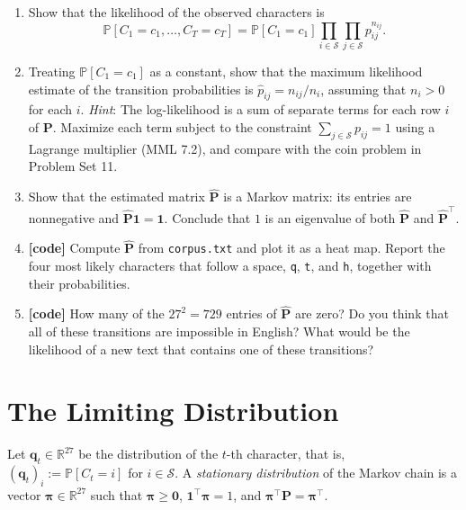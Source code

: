 \documentclass[letterpaper]{article}
\newcommand{\Real}{\mathbb{R}}
\newcommand{\tr}{^\top}
\begin{document}
\begin{enumerate}
\item Show that the likelihood of the observed characters is
  \[
    \mathbb{P}[C_1 = c_1, \dots, C_T = c_T] = \mathbb{P}[C_1 = c_1] \prod_{i \in \mathcal{S}} \prod_{j \in \mathcal{S}} p_{ij}^{n_{ij}}.
  \]
\item Treating $\mathbb{P}[C_1 = c_1]$ as a constant, show that the maximum likelihood estimate of the transition probabilities is $\hat{p}_{ij} = n_{ij} / n_i$, assuming that $n_i > 0$ for each $i$. \emph{Hint}: The log-likelihood is a sum of separate terms for each row $i$ of $\bm{P}$. Maximize each term subject to the constraint $\sum_{j \in \mathcal{S}} p_{ij} = 1$ using a Lagrange multiplier (MML 7.2), and compare with the coin problem in Problem Set 11.
\item Show that the estimated matrix $\hat{\bm{P}}$ is a Markov matrix: its entries are nonnegative and $\hat{\bm{P}} \bm{1} = \bm{1}$. Conclude that $1$ is an eigenvalue of both $\hat{\bm{P}}$ and $\hat{\bm{P}}\tr$.
\item \textbf{[code]} Compute $\hat{\bm{P}}$ from \texttt{corpus.txt} and plot it as a heat map. Report the four most likely characters that follow a space, \texttt{q}, \texttt{t}, and \texttt{h}, together with their probabilities.
\item \textbf{[code]} How many of the $27^2 = 729$ entries of $\hat{\bm{P}}$ are zero? Do you think that all of these transitions are impossible in English? What would be the likelihood of a new text that contains one of these transitions?
\end{enumerate}

\section{The Limiting Distribution}

Let $\bm{q}_t \in \Real^{27}$ be the distribution of the $t$-th character, that is, $(\bm{q}_t)_i := \mathbb{P}[C_t = i]$ for $i \in \mathcal{S}$. A \emph{stationary distribution} of the Markov chain is a vector $\bm{\pi} \in \Real^{27}$ such that $\bm{\pi} \ge \bm{0}$, $\bm{1}\tr \bm{\pi} = 1$, and $\bm{\pi}\tr \bm{P} = \bm{\pi}\tr$.
\end{document}
